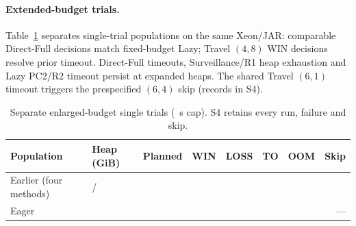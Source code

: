 \paragraph{Extended-budget trials.}
Table~\ref{tab:extended-budget-main} separates single-trial populations on the same Xeon/JAR: \ExtFixedComparable{} comparable Direct-Full decisions match fixed-budget Lazy; \ExtFixedUncompared{} Travel $(4,8)$ WIN decisions resolve prior timeout.
Direct-Full timeouts, Surveillance/R1 heap exhaustion and Lazy PC2/R2 timeout persist at expanded heaps. The shared Travel $(6,1)$ timeout triggers the prespecified $(6,4)$ skip (records in S4).
\begin{table}[!htbp]
\caption{Separate enlarged-budget single trials (\ExtBudgetTimeCap{}~s cap). S4 retains every run, failure and skip.}
\label{tab:extended-budget-main}
\centering\small
\begin{tabular}{@{}llrrrrrr@{}}\toprule
Population & Heap (GiB) & Planned & WIN & LOSS & TO & OOM & Skip\\\midrule
Earlier (four methods) & \ExtBudgetInitialHeap{}/\ExtBudgetExpandedHeap{} & \ExtBudgetPlanned{} & \ExtBudgetWins{} & \ExtBudgetLosses{} & \ExtBudgetTimeout{} & \ExtBudgetOOM{} & \ExtBudgetSkipped{}\\
Eager & \VThreeExtSevenHeap{} & \VThreeExtSevenTrials{} & \VThreeExtSevenWin{} & \VThreeExtSevenLoss{} & \VThreeExtSevenTO{} & \VThreeExtSevenOOM{} & ---\\\bottomrule
\end{tabular}
\end{table}


